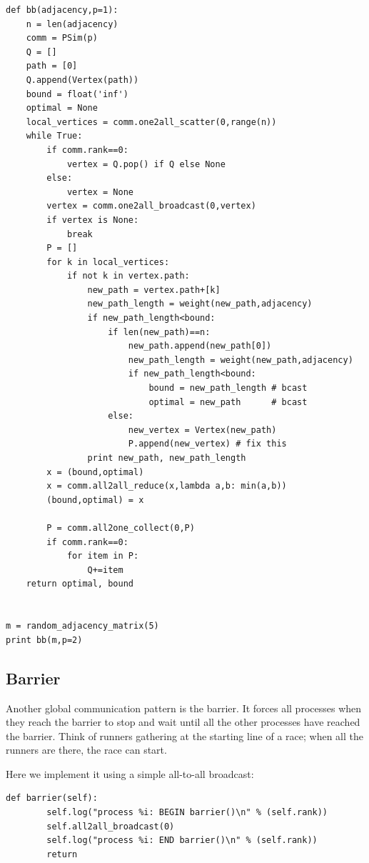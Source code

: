 \documentclass[justified,sixbynine]{tufte-book}
\def\ft{\small\tt}
\theoremstyle{plain}%
\theoremstyle{definition}
\theoremstyle{remark}
\begin{document}
\begin{fullwidth}
\begin{lstlisting}[caption={in file: {\ft psim\_prim.py}}]
def bb(adjacency,p=1):
    n = len(adjacency)
    comm = PSim(p)
    Q = []
    path = [0]
    Q.append(Vertex(path))
    bound = float('inf')
    optimal = None
    local_vertices = comm.one2all_scatter(0,range(n))
    while True:
        if comm.rank==0:
            vertex = Q.pop() if Q else None
        else:
            vertex = None
        vertex = comm.one2all_broadcast(0,vertex)
        if vertex is None:
            break
        P = []
        for k in local_vertices:
            if not k in vertex.path:
                new_path = vertex.path+[k]
                new_path_length = weight(new_path,adjacency)
                if new_path_length<bound:
                    if len(new_path)==n:
                        new_path.append(new_path[0])
                        new_path_length = weight(new_path,adjacency)
                        if new_path_length<bound:
                            bound = new_path_length # bcast
                            optimal = new_path      # bcast
                    else:
                        new_vertex = Vertex(new_path)
                        P.append(new_vertex) # fix this
                print new_path, new_path_length
        x = (bound,optimal)
        x = comm.all2all_reduce(x,lambda a,b: min(a,b))
        (bound,optimal) = x

        P = comm.all2one_collect(0,P)
        if comm.rank==0:
            for item in P:
                Q+=item
    return optimal, bound


m = random_adjacency_matrix(5)
print bb(m,p=2)
\end{lstlisting}

\goodbreak\subsection{Barrier}

Another global communication pattern is the barrier. It forces all processes when they reach the barrier to stop and wait until all the other processes have reached the barrier. Think of runners gathering at the  starting line  of a race; when  all the runners are there, the race can start.

Here we implement it using a simple all-to-all broadcast:

\begin{lstlisting}[caption={in file: {\ft psim.py}}]
    def barrier(self):
        self.log("process %i: BEGIN barrier()\n" % (self.rank))
        self.all2all_broadcast(0)
        self.log("process %i: END barrier()\n" % (self.rank))
        return
\end{lstlisting}


\end{fullwidth}
\end{document}
